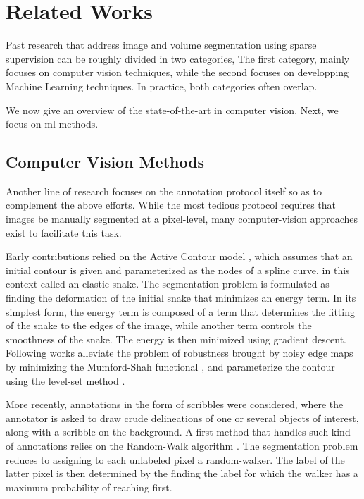 \section{Related Works}

Past research that address image and volume segmentation using sparse supervision can be roughly divided in two categories,
The first category, mainly focuses on computer vision techniques, while the second focuses on developping Machine Learning techniques.
In practice, both categories often overlap.

We now give an overview of the state-of-the-art in computer vision.
Next, we focus on \gls{ml} methods.


\subsection{Computer Vision Methods}
Another line of research focuses on the annotation protocol itself so as to complement the above efforts.
While the most tedious protocol requires that images be manually segmented at a pixel-level, many computer-vision approaches exist to facilitate this task.

Early contributions relied on the Active Contour model \cite{kass88}, which assumes that an initial contour is given and parameterized as the nodes of a spline curve, in this context called an elastic snake.
The segmentation problem is formulated as finding the deformation of the initial snake that minimizes an energy term.
In its simplest form, the energy term is composed of a term that determines the fitting of the snake to the edges of the image, while another term controls the smoothness of the snake.
The energy is then minimized using gradient descent.
Following works alleviate the problem of robustness brought by noisy edge maps by minimizing the Mumford-Shah functional \cite{chan01}, and parameterize the contour using the level-set method \cite{osher88}.

More recently, annotations in the form of scribbles were considered, where the annotator is asked to draw crude delineations of one or several objects of interest, along with a scribble on the background.
A first method that handles such kind of annotations relies on the Random-Walk algorithm \cite{grady06}.
The segmentation problem reduces to assigning to each unlabeled pixel a random-walker. The label of the latter pixel is then determined by the finding the label for which the walker has a maximum probability of reaching first.

